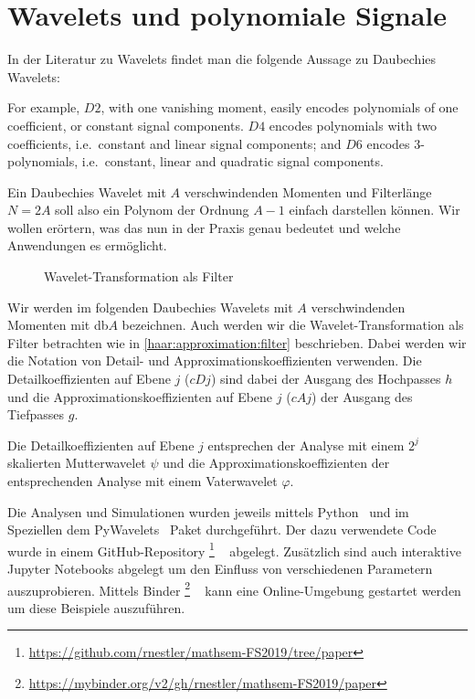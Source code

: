 %
%
%
\chapter{Wavelets und polynomiale Signale\label{chapter:thema}}
\begin{refsection}

In der Literatur zu Wavelets findet man die folgende Aussage zu Daubechies
Wavelets:
\begin{displayquote}
For example, $D2$, with one vanishing moment, easily encodes polynomials of one
coefficient, or constant signal components. $D4$ encodes polynomials with two
coefficients, i.e.\ constant and linear signal components; and $D6$ encodes
3-polynomials, i.e.\ constant, linear and quadratic signal components.
\end{displayquote}
Ein Daubechies Wavelet mit $A$ verschwindenden Momenten und Filterlänge $N=2A$
soll also ein Polynom der Ordnung $A-1$ einfach darstellen können. Wir wollen
erörtern, was das nun in der Praxis genau bedeutet und welche Anwendungen es
ermöglicht.

\begin{figure}
    \centering
    
    \caption{Wavelet-Transformation als Filter\label{polynomials:filter}}
\end{figure}

Wir werden im folgenden Daubechies Wavelets mit $A$ verschwindenden Momenten
mit db$A$ bezeichnen. Auch werden wir die Wavelet-Transformation als Filter
betrachten wie in \cref{haar:approximation:filter} beschrieben. Dabei werden
wir die Notation von Detail- und Approximationskoeffizienten verwenden. Die
Detailkoeffizienten auf Ebene $j$ ($cDj$) sind dabei der Ausgang des Hochpasses
$h$ und die Approximationskoeffizienten auf Ebene $j$ ($cAj$) der Ausgang des
Tiefpasses $g$.

Die Detailkoeffizienten auf Ebene $j$ entsprechen der Analyse mit einem $2^j$
skalierten Mutterwavelet $\psi$ und die Approximationskoeffizienten der
entsprechenden Analyse mit einem Vaterwavelet $\varphi$.

Die Analysen und Simulationen wurden jeweils mittels Python~\cite{python} und im
Speziellen dem PyWavelets~\cite{gregory_r_lee_2019_2634243} Paket durchgeführt.
Der dazu verwendete Code wurde in einem GitHub-Repository%
\footnote{\url{https://github.com/rnestler/mathsem-FS2019/tree/paper}}%
~\cite{polynomials:repo}
abgelegt. Zusätzlich sind auch interaktive Jupyter Notebooks abgelegt um den
Einfluss von verschiedenen Parametern auszuprobieren. Mittels
Binder%
\footnote{\url{https://mybinder.org/v2/gh/rnestler/mathsem-FS2019/paper}}%
~\cite{project_jupyter-proc-scipy-2018}
kann eine Online-Umgebung gestartet werden um diese Beispiele auszuführen.


\end{refsection}
